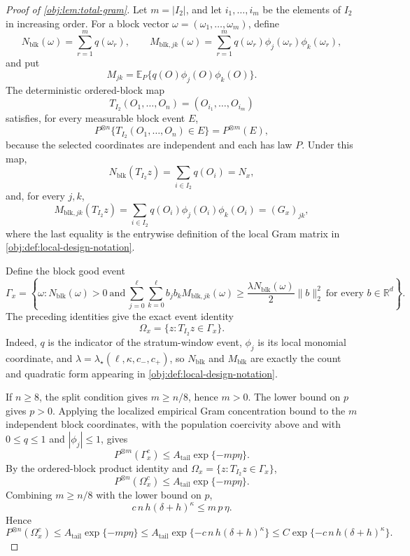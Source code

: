 \documentclass[11pt]{article}
\begin{document}
\begin{proof}[Proof of \cref{obj:lem:total-gram}]
Let \(m=|I_2|\), and let \(i_1,\ldots,i_m\) be the elements of \(I_2\) in increasing order.  For a block vector \(\omega=(\omega_1,\ldots,\omega_m)\), define
\[
N_{\mathrm{blk}}(\omega)=\sum_{r=1}^m q(\omega_r),\qquad
M_{\mathrm{blk},jk}(\omega)=\sum_{r=1}^m q(\omega_r)\phi_j(\omega_r)\phi_k(\omega_r),
\]
and put
\[
M_{jk}=\mathbb E_P\{q(O)\phi_j(O)\phi_k(O)\}.
\]
The deterministic ordered-block map
\[
T_{I_2}(O_1,\ldots,O_n)=(O_{i_1},\ldots,O_{i_m})
\]
satisfies, for every measurable block event \(E\),
\[
P^{\otimes n}\{T_{I_2}(O_1,\ldots,O_n)\in E\}=P^{\otimes m}(E),
\]
because the selected coordinates are independent and each has law \(P\).  Under this map,
\[
N_{\mathrm{blk}}(T_{I_2}z)
=
\sum_{i\in I_2}q(O_i)=N_x,
\]
and, for every \(j,k\),
\[
M_{\mathrm{blk},jk}(T_{I_2}z)
=
\sum_{i\in I_2}q(O_i)\phi_j(O_i)\phi_k(O_i)
=(G_x)_{jk},
\]
where the last equality is the entrywise definition of the local Gram matrix in \cref{obj:def:local-design-notation}.

Define the block good event
\[
\Gamma_x=
\left\{
\omega:
N_{\mathrm{blk}}(\omega)>0
\ \text{and}\ 
\sum_{j=0}^{\ell}\sum_{k=0}^{\ell}
 b_jb_k M_{\mathrm{blk},jk}(\omega)
\ge
\frac{\lambda N_{\mathrm{blk}}(\omega)}{2}\|b\|_2^2
\ \text{for every } b\in\mathbb R^d
\right\}.
\]
The preceding identities give the exact event identity
\[
\Omega_x=\{z:T_{I_2}z\in\Gamma_x\}.
\]
Indeed, \(q\) is the indicator of the stratum-window event, \(\phi_j\) is its local monomial coordinate, and \(\lambda=\lambda_\star(\ell,\kappa,c_-,c_+)\), so \(N_{\mathrm{blk}}\) and \(M_{\mathrm{blk}}\) are exactly the count and quadratic form appearing in \cref{obj:def:local-design-notation}. %

If \(n\ge8\), the split condition gives \(m\ge n/8\), hence \(m>0\).  The lower bound on \(p\) gives \(p>0\).  Applying the localized empirical Gram concentration bound to the \(m\) independent block coordinates, with the population coercivity above and with \(0\le q\le1\) and \(|\phi_j|\le1\), gives
\[
P^{\otimes m}(\Gamma_x^c)
\le
A_{\mathrm{tail}}\exp\{-mp\eta\}.
\]
By the ordered-block product identity and \(\Omega_x=\{z:T_{I_2}z\in\Gamma_x\}\),
\[
P^{\otimes n}(\Omega_x^c)
\le
A_{\mathrm{tail}}\exp\{-mp\eta\}.
\]
Combining \(m\ge n/8\) with the lower bound on \(p\),
\[
c\,n\,h(\delta+h)^\kappa
\le
m\,p\,\eta .
\]
Hence
\[
P^{\otimes n}(\Omega_x^c)
\le
A_{\mathrm{tail}}\exp\{-mp\eta\}
\le
A_{\mathrm{tail}}\exp\{-c\,n\,h(\delta+h)^\kappa\}
\le
C\exp\{-c\,n\,h(\delta+h)^\kappa\}.
\]


\end{proof}
\end{document}
